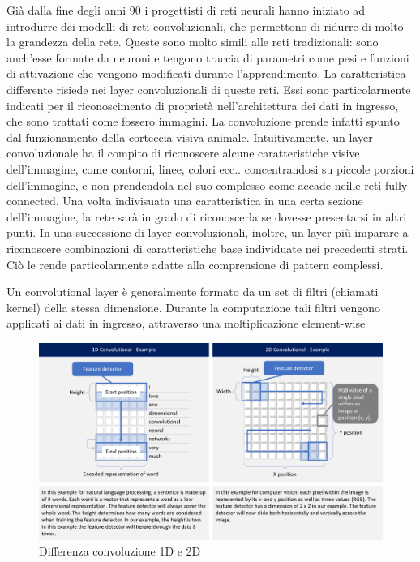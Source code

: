 \documentclass{article}
\begin{document}
Già dalla fine degli anni 90 i progettisti di reti neurali hanno iniziato ad introdurre dei modelli di reti convoluzionali, che permettono di ridurre di molto la grandezza della rete. Queste sono molto simili alle reti tradizionali: sono anch'esse formate da neuroni e tengono traccia di parametri come pesi e funzioni di attivazione che vengono modificati durante l'apprendimento. La caratteristica differente risiede nei layer convoluzionali di queste reti. Essi sono particolarmente indicati per il riconoscimento di proprietà nell'architettura dei dati in ingresso, che sono trattati come fossero immagini. La convoluzione prende infatti spunto dal funzionamento della corteccia visiva animale. Intuitivamente, un layer convoluzionale ha il compito di riconoscere alcune caratteristiche visive dell'immagine, come contorni, linee, colori ecc.. concentrandosi su piccole porzioni dell'immagine, e non prendendola nel suo complesso come accade neille reti fully-connected. Una volta indivisuata una caratteristica in una certa sezione dell'immagine, la rete sarà in grado di riconoscerla se dovesse presentarsi in altri punti. In una successione di layer convoluzionali, inoltre, un layer più imparare a riconoscere combinazioni di caratteristiche base individuate nei precedenti strati. Ciò le rende particolarmente adatte alla comprensione di pattern complessi. 

Un convolutional layer è generalmente formato da un set di filtri (chiamati kernel) della stessa dimensione. Durante la computazione tali filtri vengono applicati ai dati in ingresso, attraverso una moltiplicazione element-wise
\begin{figure}[!h]
\centering
\includegraphics[scale=0.2]{conv1d}
\caption{Differenza convoluzione 1D e 2D}
\end{figure}
\end{document}
